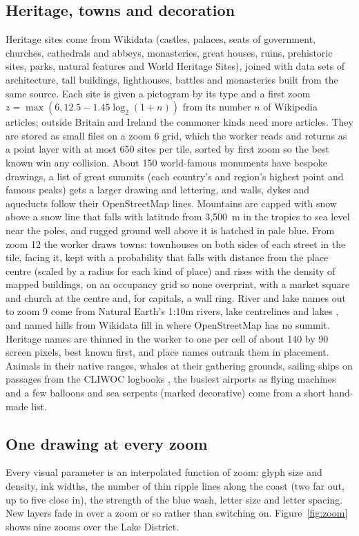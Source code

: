 \documentclass[11pt,a4paper]{article}
\begin{document}
\subsection{Heritage, towns and decoration}
Heritage sites come from Wikidata \citep{wikidata} (castles, palaces, seats of government, churches, cathedrals and abbeys, monasteries, great houses, ruins, prehistoric sites, parks, natural features and World Heritage Sites), joined with data sets of architecture, tall buildings, lighthouses, battles and monasteries built from the same source. Each site is given a pictogram by its type and a first zoom $z = \max(6, 12.5 - 1.45\log_2(1 + n))$ from its number $n$ of Wikipedia articles; outside Britain and Ireland the commoner kinds need more articles. They are stored as small files on a zoom 6 grid, which the worker reads and returns as a point layer with at most 650 sites per tile, sorted by first zoom so the best known win any collision. About 150 world-famous monuments have bespoke drawings, a list of great summits (each country's and region's highest point and famous peaks) gets a larger drawing and lettering, and walls, dykes and aqueducts follow their OpenStreetMap lines. Mountains are capped with snow above a snow line that falls with latitude from 3,500~m in the tropics to sea level near the poles, and rugged ground well above it is hatched in pale blue. From zoom 12 the worker draws towns: townhouses on both sides of each street in the tile, facing it, kept with a probability that falls with distance from the place centre (scaled by a radius for each kind of place) and rises with the density of mapped buildings, on an occupancy grid so none overprint, with a market square and church at the centre and, for capitals, a wall ring. River and lake names out to zoom 9 come from Natural Earth's 1:10m rivers, lake centrelines and lakes \citep{naturalearth}, and named hills from Wikidata fill in where OpenStreetMap has no summit. Heritage names are thinned in the worker to one per cell of about 140 by 90 screen pixels, best known first, and place names outrank them in placement. Animals in their native ranges, whales at their gathering grounds, sailing ships on passages from the CLIWOC logbooks \citep{cliwoc}, the busiest airports as flying machines and a few balloons and sea serpents (marked decorative) come from a short hand-made list.

\subsection{One drawing at every zoom}
Every visual parameter is an interpolated function of zoom: glyph size and density, ink widths, the number of thin ripple lines along the coast (two far out, up to five close in), the strength of the blue wash, letter size and letter spacing. New layers fade in over a zoom or so rather than switching on. Figure~\ref{fig:zoom} shows nine zooms over the Lake District.
\end{document}
